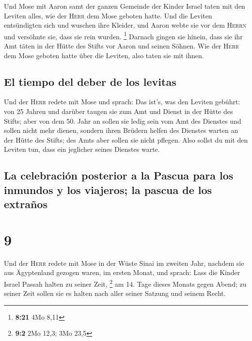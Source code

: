  Und Mose mit Aaron samt der ganzen Gemeinde der Kinder
Israel taten mit den Leviten alles, wie der \textsc{Herr} dem Mose
geboten hatte.  Und die Leviten entsündigten sich und
wuschen ihre Kleider, und Aaron webte sie vor dem \textsc{Herrn} und
versöhnte sie, dass sie rein wurden. \footnote{\textbf{8:21} 4Mo 8,11}
 Darnach gingen sie hinein, dass sie ihr Amt täten in der
Hütte des Stifts vor Aaron und seinen Söhnen. Wie der \textsc{Herr} dem
Mose geboten hatte über die Leviten, also taten sie mit ihnen.

\hypertarget{el-tiempo-del-deber-de-los-levitas}{%
\subsection{El tiempo del deber de los
levitas}\label{el-tiempo-del-deber-de-los-levitas}}

 Und der \textsc{Herr} redete mit Mose und sprach:
 Das ist's, was den Leviten gebührt: von 25 Jahren und
darüber taugen sie zum Amt und Dienst in der Hütte des Stifts;
 aber von dem 50. Jahr an sollen sie ledig sein vom Amt
des Dienstes und sollen nicht mehr dienen,  sondern ihren
Brüdern helfen des Dienstes warten an der Hütte des Stifts; des Amts
aber sollen sie nicht pflegen. Also sollst du mit den Leviten tun, dass
ein jeglicher seines Dienstes warte.

\hypertarget{la-celebraciuxf3n-posterior-a-la-pascua-para-los-inmundos-y-los-viajeros-la-pascua-de-los-extrauxf1os}{%
\subsection{La celebración posterior a la Pascua para los inmundos y los
viajeros; la pascua de los
extraños}\label{la-celebraciuxf3n-posterior-a-la-pascua-para-los-inmundos-y-los-viajeros-la-pascua-de-los-extrauxf1os}}

\hypertarget{section-8}{%
\section{9}\label{section-8}}

 Und der \textsc{Herr} redete mit Mose in der Wüste Sinai
im zweiten Jahr, nachdem sie aus Ägyptenland gezogen waren, im ersten
Monat, und sprach:  Lass die Kinder Israel Passah halten
zu seiner Zeit, \footnote{\textbf{9:2} 2Mo 12,3; 3Mo 23,5}
 am 14. Tage dieses Monats gegen Abend; zu seiner Zeit
sollen sie es halten nach aller seiner Satzung und seinem Recht.

